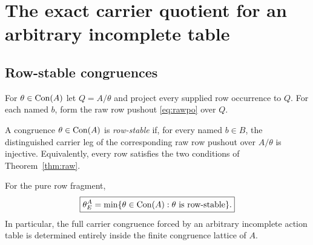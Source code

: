 \section{The exact carrier quotient for an arbitrary incomplete table}\label{sec:mainquotient}

\subsection{Row-stable congruences}

For $\theta\in\operatorname{Con}(A)$ let $Q=A/\theta$ and project every supplied row occurrence to $Q$.  For each named $b$, form the raw row pushout \eqref{eq:rawpo} over $Q$.

\begin{definition}
A congruence $\theta\in\operatorname{Con}(A)$ is \emph{row-stable} if, for every named $b\in B$, the distinguished carrier leg of the corresponding raw row pushout over $A/\theta$ is injective.  Equivalently, every row satisfies the two conditions of Theorem~\ref{thm:raw}.
\end{definition}

\begin{theorem}\label{thm:leaststable}
For the pure row fragment,
\begin{equation}\label{eq:leaststable}
\boxed{
\theta_E^A
=
\min\{\theta\in\operatorname{Con}(A):\theta\text{ is row-stable}\}.
}
\end{equation}
In particular, the full carrier congruence forced by an arbitrary incomplete action table is determined entirely inside the finite congruence lattice of $A$.
\end{theorem}

